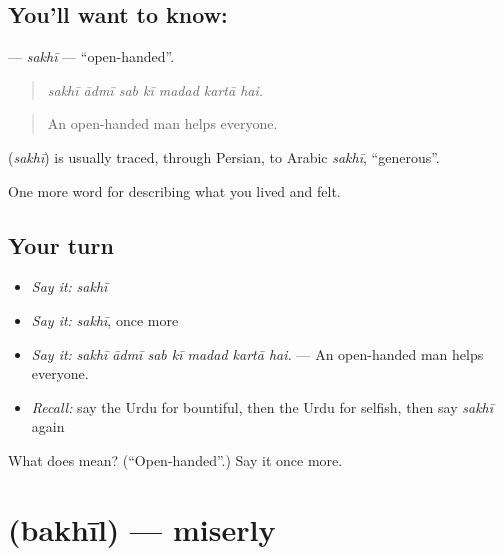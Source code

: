 \subsection*{You'll want to know: }
\textbf{} — \emph{sakhī} — \textquotedblleft{}open-handed\textquotedblright{}.

\begin{quote}
      
\end{quote}

\begin{quote}
\emph{sakhī ādmī sab kī madad kartā hai.}
\end{quote}

\begin{quote}
An open-handed man helps everyone.
\end{quote}

\begin{cousinweb}
\textbf{} (\emph{sakhī}) is usually traced, through Persian, to Arabic \emph{sakhī}, \textquotedblleft{}generous\textquotedblright{}.
\end{cousinweb}

\begin{grammarlens}[title={What you've built}]
One more word for describing what you lived and felt.
\end{grammarlens}

\subsection*{Your turn}
\begin{itemize}
\raggedright
  \item \emph{Say it:} \emph{sakhī}
  \item \emph{Say it:} \emph{sakhī}, once more
  \item \emph{Say it:} \emph{sakhī ādmī sab kī madad kartā hai.} — An open-handed man helps everyone.
  \item \emph{Recall:} say the Urdu for bountiful, then the Urdu for selfish, then say \emph{sakhī} again
\end{itemize}

\begin{tcolorbox}[breakable,colback=teal!4,colframe=teal!35!black,title={Before you move on}]
What does  mean? (\textquotedblleft{}Open-handed\textquotedblright{}.) Say it once more.
\end{tcolorbox}
\section[\texorpdfstring{\ur{بخیل} (bakhīl)}{بخیل (bakhīl)}]{ (bakhīl) — miserly}


